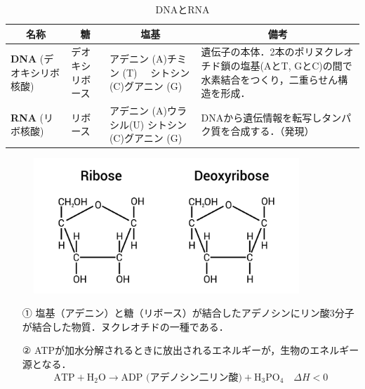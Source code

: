 \documentclass[a4paper,12pt]{ltjsarticle}
\begin{document}
\newpage
\begin{table}[h!]
\centering
\begin{tabular}{|p{4cm}|l|p{2.5cm}|p{5cm}|}
\hline
\multicolumn{1}{|c|}{\textbf{名称}} & \multicolumn{1}{c|}{\textbf{糖}} & \multicolumn{1}{c|}{\textbf{塩基}} & \multicolumn{1}{c|}{\textbf{備考}} \\ \hline
\textbf{DNA} \newline (デオキシリボ核酸) & デオキシリボース & アデニン (A)チミン (T)　 シトシン (C)グアニン (G) & 遺伝子の本体．2本のポリヌクレオチド鎖の塩基(AとT, GとC)の間で水素結合をつくり，二重らせん構造を形成． \\ 
\hline
\textbf{RNA} \newline (リボ核酸) & リボース &アデニン (A)ウラシル(U) シトシン (C)グアニン (G)  & DNAから遺伝情報を転写しタンパク質を合成する．（発現） \\ 
\hline
\end{tabular}
\caption{DNAとRNA}
\end{table}
\begin{figure}[H]
    \centering
    \includegraphics[width=10cm]{ribo-su.png}
\end{figure}
\begin{itemize}
    \item[①] 塩基（アデニン）と糖（リボース）が結合したアデノシンにリン酸3分子が結合した物質．ヌクレオチドの一種である．
    \item[②] ATPが加水分解されるときに放出されるエネルギーが，生物のエネルギー源となる．
    \[ \text{ATP} + \text{H}_2\text{O} \longrightarrow \text{ADP (アデノシン二リン酸)} + \text{H}_3\text{PO}_4 \quad \Delta H < 0 \]
\end{itemize}
\end{document}
